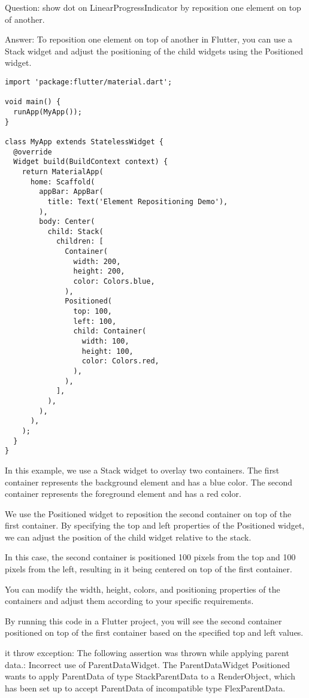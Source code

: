 Question: show dot on LinearProgressIndicator by reposition one element on top of another.

Answer: To reposition one element on top of another in Flutter, you can use a Stack widget and adjust the 
positioning of the child widgets using the Positioned widget.

\begin{lstlisting}
import 'package:flutter/material.dart';

void main() {
  runApp(MyApp());
}

class MyApp extends StatelessWidget {
  @override
  Widget build(BuildContext context) {
    return MaterialApp(
      home: Scaffold(
        appBar: AppBar(
          title: Text('Element Repositioning Demo'),
        ),
        body: Center(
          child: Stack(
            children: [
              Container(
                width: 200,
                height: 200,
                color: Colors.blue,
              ),
              Positioned(
                top: 100,
                left: 100,
                child: Container(
                  width: 100,
                  height: 100,
                  color: Colors.red,
                ),
              ),
            ],
          ),
        ),
      ),
    );
  }
}
\end{lstlisting}

In this example, we use a Stack widget to overlay two containers. The first container represents the background 
element and has a blue color. The second container represents the foreground element and has a red color.

We use the Positioned widget to reposition the second container on top of the first container. By specifying 
the top and left properties of the Positioned widget, we can adjust the position of the child widget relative 
to the stack.

In this case, the second container is positioned 100 pixels from the top and 100 pixels from the left, resulting 
in it being centered on top of the first container.

You can modify the width, height, colors, and positioning properties of the containers and adjust them 
according to your specific requirements.

By running this code in a Flutter project, you will see the second container positioned on top of the first 
container based on the specified top and left values.


it throw exception:
The following assertion was thrown while applying parent data.:
Incorrect use of ParentDataWidget.
The ParentDataWidget Positioned wants to apply ParentData of type StackParentData to a RenderObject,
which has been set up to accept ParentData of incompatible type FlexParentData.

